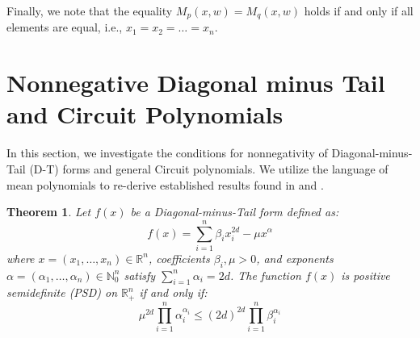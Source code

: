 \documentclass{article}
\newtheorem{theorem}{Theorem}
\begin{document}
Finally, we note that the equality $M_p(x, w) = M_q(x, w)$ holds if and only if all elements are equal, i.e., 
$x_1 = x_2 = \dots = x_n$.

\section{Nonnegative Diagonal minus Tail and Circuit Polynomials}\label{s03}

In this section, we investigate the conditions for nonnegativity of Diagonal-minus-Tail (D-T) forms and general 
Circuit polynomials. We utilize the language of mean polynomials to re-derive established results 
found in \cite{GM01} and \cite{DIdW01}.

\begin{theorem}\label{thm:DT_PSD}
Let $f(x)$ be a Diagonal-minus-Tail form defined as:
\[
   f(x) = \sum_{i=1}^n \beta_i x_i^{2d} - \mu x^{\alpha}
\]
where $x = (x_1, \dots, x_n) \in \mathbb{R}^n$, coefficients $\beta_i, \mu > 0$, and exponents 
$\alpha = (\alpha_1, \dots, \alpha_n) \in \mathbb{N}_0^n$ satisfy $\sum_{i=1}^n \alpha_i = 2d$.
The function $f(x)$ is positive semidefinite (PSD) on $\mathbb{R}_+^n$ if and only if:
\[
   \mu^{2d} \prod_{i=1}^n \alpha_i^{\alpha_i} \leq (2d)^{2d} \prod_{i=1}^n \beta_i^{\alpha_i}
\]
\end{theorem}
\end{document}
